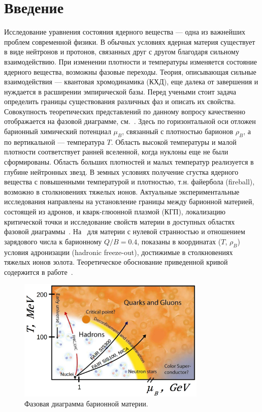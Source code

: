 \chapter*{Введение}\label{sec:secIntro}

Исследование уравнения состояния ядерного вещества --- одна из важнейших проблем современной физики. В обычных условиях ядерная материя существует в виде нейтронов и протонов, связанных друг с другом благодаря сильному взаимодействию. При изменении плотности и температуры изменяется состояние ядерного вещества, возможны фазовые переходы. Теория, описывающая сильные взаимодействия --- квантовая хромодинамика (КХД), еще далека от завершения и нуждается в расширении эмпирической базы. Перед учеными стоит задача определить границы существования различных фаз и описать их свойства. Совокупность теоретических представлений по данному вопросу качественно отображается на фазовой диаграмме, см.~. Здесь по горизонтальной оси отложен барионный химический потенциал $\mu_{B}$, связанный с плотностью барионов $\rho_{B}$, а по вертикальной --- температура $T$. Область высокой температуры и малой плотности соответствует ранней вселенной, когда нуклоны еще не были сформированы. Область больших плотностей и малых температур реализуется в глубине нейтронных звезд. В земных условиях получение сгустка ядерного вещества с повышенными температурой и плотностью, т.н. файербола (fireball), возможно в столкновениях тяжелых ионов. Актуальные экспериментальные исследования направлены на установление границы между барионной материей, состоящей из адронов, и кварк-глюонной плазмой (КГП), локализацию критической точки и исследование свойств материи в доступных областях фазовой диаграммы~\cite{CBMBook}.
На~ для материи с нулевой странностью и отношением зарядового числа к барионному $Q/B=0.4$, показаны в координатах ($T$, $\rho_{B}$) условия адронизации (hadronic freeze-out), достижимые в столкновениях тяжелых ионов золота. Теоретическое обоснование приведенной кривой содержится в работе~\cite{Randrup}.

\begin{figure}[H]
\includegraphics[width=0.8\textwidth]{pictures/QGP_phase_diag_3.png}
\caption{Фазовая диаграмма барионной материи.}
\label{fig:PhaseDiagram}
\end{figure}

